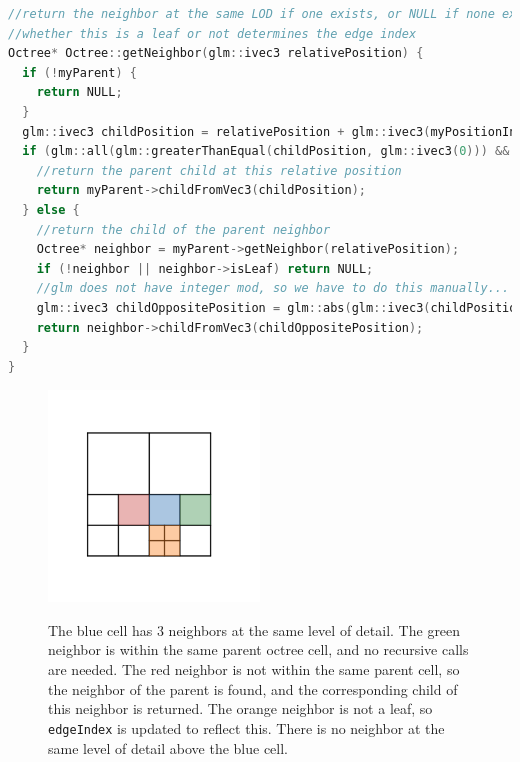 \documentclass[11pt]{article}
\begin{document}
\begin{lstlisting}[language=C++,label={octree_neighbor},caption={Code for finding the neighbor of a node at the same level of detail in an octree. The children of a node are stored as a 3D array of pointers: \texttt{Octree* myChildren[2][2][2];}. \texttt{relativePosition} is a 3-component vector, where exactly one component is non-zero, corresponding to the direction in which to look for the neighbor. For example, a value of $\left(1,0,0\right)$ searches in the positive X direction.}]
//return the neighbor at the same LOD if one exists, or NULL if none exists
//whether this is a leaf or not determines the edge index
Octree* Octree::getNeighbor(glm::ivec3 relativePosition) {
  if (!myParent) {
    return NULL;
  }
  glm::ivec3 childPosition = relativePosition + glm::ivec3(myPositionInParent);
  if (glm::all(glm::greaterThanEqual(childPosition, glm::ivec3(0))) && glm::all(glm::lessThanEqual(childPosition,glm::ivec3(1)))) {
    //return the parent child at this relative position
    return myParent->childFromVec3(childPosition);
  } else {
    //return the child of the parent neighbor
    Octree* neighbor = myParent->getNeighbor(relativePosition);
    if (!neighbor || neighbor->isLeaf) return NULL;
    //glm does not have integer mod, so we have to do this manually...
    glm::ivec3 childOppositePosition = glm::abs(glm::ivec3(childPosition.x % 2, childPosition.y % 2, childPosition.z % 2));
    return neighbor->childFromVec3(childOppositePosition);
  }
}
\end{lstlisting}

\begin{figure}
  \caption{The blue cell has 3 neighbors at the same level of detail. The green neighbor is within the same parent octree cell, and no recursive calls are needed. The red neighbor is not within the same parent cell, so the neighbor of the parent is found, and the corresponding child of this neighbor is returned. The orange neighbor is not a leaf, so \texttt{edgeIndex} is updated to reflect this. There is no neighbor at the same level of detail above the blue cell.}
  \includegraphics[width=0.5\textwidth]{octree_neighbors.png}
  \label{fig:octree_neighbors}
\end{figure}
\end{document}
